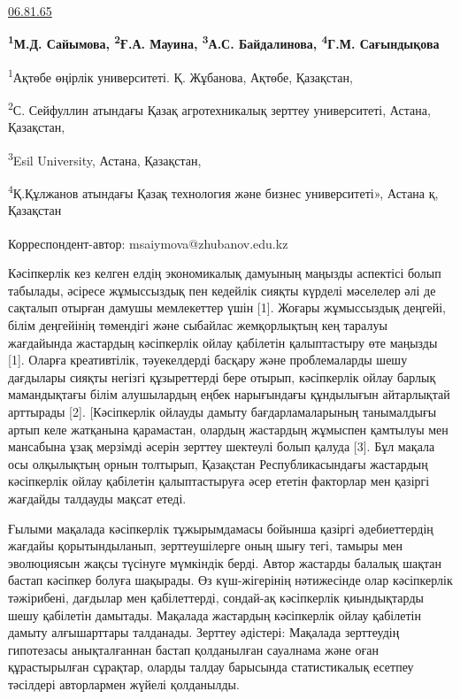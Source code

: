 

\href{https://grnti.ru/?p1=06&p2=81&p3=65\#65}{06.81.65}
\begin{articleheader}


{\bfseries \textsuperscript{1}М.Д. Сайымова\textsuperscript{\envelope },
\textsuperscript{2}Ғ.А. Мауина, \textsuperscript{3}А.С. Байдалинова,
\textsuperscript{4}Г.М. Сағындықова}
\end{articleheader}
\begin{affiliation}
\textsuperscript{1}Ақтөбе өңірлік университеті. Қ. Жұбанова, Ақтөбе,
Қазақстан,

\textsuperscript{2}С. Сейфуллин атындағы Қазақ агротехникалық зерттеу
университеті, Астана, Қазақстан,

\textsuperscript{3}Esil University, Астана, Қазақстан,

\textsuperscript{4}Қ.Құлжанов атындағы Қазақ технология және бизнес
университеті», Астана қ, Қазақстан

\raggedright {\bfseries \textsuperscript{\envelope }}Корреспондент-автор: msaiymova@zhubanov.edu.kz
\end{affiliation}

Кәсіпкерлік кез келген елдің экономикалық дамуының маңызды аспектісі
болып табылады, әсіресе жұмыссыздық пен кедейлік сияқты күрделі
мәселелер әлі де сақталып отырған дамушы мемлекеттер үшін {[}1{]}.
Жоғары жұмыссыздық деңгейі, білім деңгейінің төмендігі және сыбайлас
жемқорлықтың кең таралуы жағдайында жастардың кәсіпкерлік ойлау
қабілетін қалыптастыру өте маңызды {[}1{]}. Оларға креативтілік,
тәуекелдерді басқару және проблемаларды шешу дағдылары сияқты негізгі
құзыреттерді бере отырып, кәсіпкерлік ойлау барлық мамандықтағы білім
алушылардың еңбек нарығындағы құндылығын айтарлықтай арттырады {[}2{]}.
{[}Кәсіпкерлік ойлауды дамыту бағдарламаларының танымалдығы артып келе
жатқанына қарамастан, олардың жастардың жұмыспен қамтылуы мен мансабына
ұзақ мерзімді әсерін зерттеу шектеулі болып қалуда {[}3{]}. Бұл мақала
осы олқылықтың орнын толтырып, Қазақстан Республикасындағы жастардың
кәсіпкерлік ойлау қабілетін қалыптастыруға әсер ететін факторлар мен
қазіргі жағдайды талдауды мақсат етеді.

Ғылыми мақалада кәсіпкерлік тұжырымдамасы бойынша қазіргі әдебиеттердің
жағдайы қорытындыланып, зерттеушілерге оның шығу тегі, тамыры мен
эволюциясын жақсы түсінуге мүмкіндік берді. Автор жастарды балалық
шақтан бастап кәсіпкер болуға шақырады. Өз күш-жігерінің нәтижесінде
олар кәсіпкерлік тәжірибені, дағдылар мен қабілеттерді, сондай-ақ
кәсіпкерлік қиындықтарды шешу қабілетін дамытады. Мақалада жастардың
кәсіпкерлік ойлау қабілетін дамыту алғышарттары талданады. Зерттеу
әдістері: Мақалада зерттеудің гипотезасы анықталғаннан бастап
қолданылған сауалнама және оған құрастырылған сұрақтар, оларды талдау
барысында статистикалық есетпеу тәсілдері авторлармен жүйелі қолданылды.

